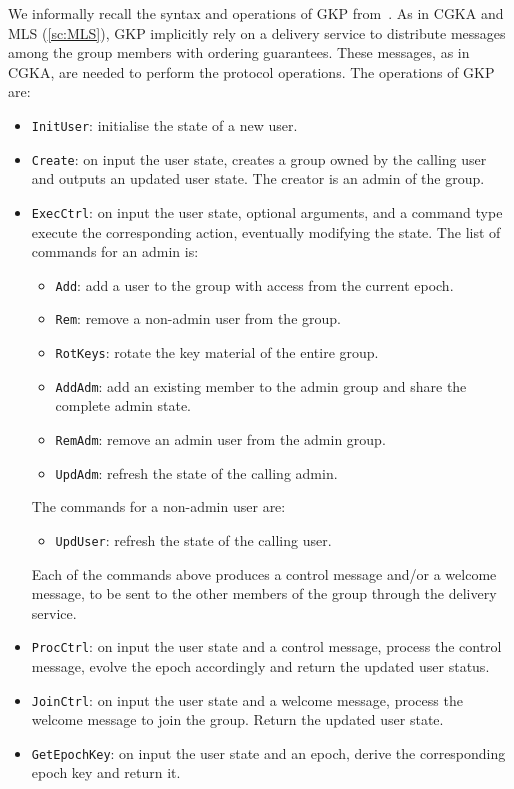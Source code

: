 We informally recall the syntax and operations of GKP from~\cite{GKP}.
As in CGKA and MLS (\cref{sc:MLS}), GKP implicitly rely on a delivery service
to distribute messages among the group members with ordering guarantees.
These messages, as in CGKA, are needed to perform the protocol operations.
The operations of GKP are:
\begin{itemize}
    \item \texttt{InitUser}: initialise the state of a new user.
    \item \texttt{Create}: on input the user state, creates a group owned by the calling user and outputs an updated user state. The creator is an admin of the group.
    \item \texttt{ExecCtrl}: on input the user state, optional arguments, and a command type execute the corresponding action, eventually modifying the state. The list of commands for an admin is:
    \begin{itemize}
        \item \texttt{Add}: add a user to the group with access from the current epoch.
        \item \texttt{Rem}: remove a non-admin user from the group.
        \item \texttt{RotKeys}: rotate the key material of the entire group.
        \item \texttt{AddAdm}: add an existing member to the admin group and share the complete admin state.
        \item \texttt{RemAdm}: remove an admin user from the admin group.
        \item \texttt{UpdAdm}: refresh the state of the calling admin. 
    \end{itemize}
    The commands for a non-admin user are:
    \begin{itemize}
        \item \texttt{UpdUser}: refresh the state of the calling user.
    \end{itemize}
    Each of the commands above produces a control message and/or a welcome message, to be sent to the other members of the group through the delivery service.
    \item \texttt{ProcCtrl}: on input the user state and a control message, process the control message, evolve the epoch accordingly and return the updated user status.
    \item \texttt{JoinCtrl}: on input the user state and a welcome message, process the welcome message to join the group. Return the updated user state.
    \item \texttt{GetEpochKey}: on input the user state and an epoch, derive the corresponding epoch key and return it.
\end{itemize}

